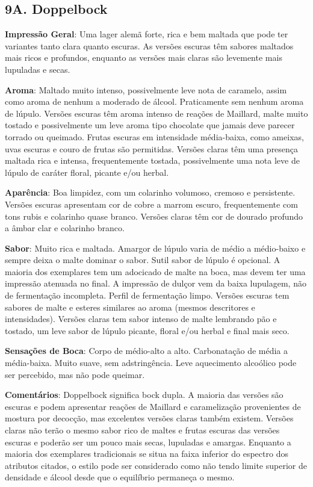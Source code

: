 \subsection*{9A. Doppelbock}
\textbf{Impressão Geral}: Uma lager alemã forte, rica e bem maltada que pode ter variantes tanto clara quanto escuras. As versões escuras têm sabores maltados mais ricos e profundos, enquanto as versões mais claras são levemente mais lupuladas e secas.

\textbf{Aroma}: Maltado muito intenso, possivelmente leve nota de caramelo, assim como aroma de nenhum a moderado de álcool. Praticamente sem nenhum aroma de lúpulo. Versões escuras têm aroma intenso de reações de Maillard, malte muito tostado e possivelmente um leve aroma tipo chocolate que jamais deve parecer torrado ou queimado. Frutas escuras em intensidade média-baixa, como ameixas, uvas escuras e couro de frutas são permitidas. Versões claras têm uma presença maltada rica e intensa, frequentemente tostada, possivelmente uma nota leve de lúpulo de caráter floral, picante e/ou herbal.

\textbf{Aparência}: Boa limpidez, com um colarinho volumoso, cremoso e persistente. Versões escuras apresentam cor de cobre a marrom escuro, frequentemente com tons rubis e colarinho quase branco. Versões claras têm cor de dourado profundo a âmbar clar e colarinho branco.

\textbf{Sabor}: Muito rica e maltada. Amargor de lúpulo varia de médio a médio-baixo e sempre deixa o malte dominar o sabor. Sutil sabor de lúpulo é opcional. A maioria dos exemplares tem um adocicado de malte na boca, mas devem ter uma impressão atenuada no final. A impressão de dulçor vem da baixa lupulagem, não de fermentação incompleta. Perfil de fermentação limpo. Versões escuras tem sabores de malte e esteres similares ao aroma (mesmos descritores e intensidades). Versões claras tem sabor intenso de malte lembrando pão e tostado, um leve sabor de lúpulo picante, floral e/ou herbal e final mais seco.

\textbf{Sensações de Boca}: Corpo de médio-alto a alto. Carbonatação de média a média-baixa. Muito suave, sem adstringência. Leve aquecimento alcoólico pode ser percebido, mas não pode queimar.

\textbf{Comentários}: Doppelbock significa bock dupla. A maioria das versões são escuras e podem apresentar reações de Maillard e caramelização provenientes de mostura por decocção, mas excelentes versões claras também existem. Versões claras não terão o mesmo sabor rico de maltes e frutas escuras das versões escuras e poderão ser um pouco mais secas, lupuladas e amargas. Enquanto a maioria dos exemplares tradicionais se situa na faixa inferior do espectro dos atributos citados, o estilo pode ser considerado como não tendo limite superior de densidade e álcool desde que o equilíbrio permaneça o mesmo.

